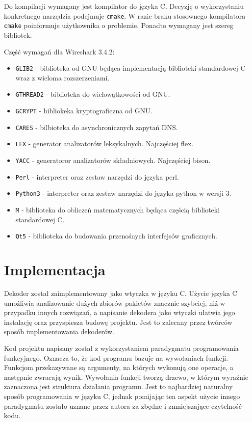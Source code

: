 \documentclass[a4paper, 12pt, twoside, openright]{article}
\begin{document}
	Do kompilacji wymagany jest kompilator do języka C. Decyzję o wykorzystaniu konkretnego narzędzia podejmuje \texttt{cmake}.
	W razie braku stosownego kompilatora \texttt{cmake} poinformuje użytkownika o problemie. Ponadto wymagany jest szereg
	bibliotek.

	Część wymagań dla Wireshark 3.4.2:
	\begin{itemize}
		\item \texttt{GLIB2} - biblioteka od GNU będąca implementacją biblioteki standardowej C wraz z wieloma rozszerzeniami.
		\item \texttt{GTHREAD2} - biblioteka do wielowątkowości od GNU.
		\item \texttt{GCRYPT} - bibliokeka kryptograficzna od GNU.
		\item \texttt{CARES} - bilbioteka do asynchronicznych zapytań DNS.
		\item \texttt{LEX} - generator analizatorów leksykalnych. Najczęściej flex.
		\item \texttt{YACC} - generatoror analizatorów składniowych. Najczęściej bison.
		\item \texttt{Perl} - interpreter oraz zestaw narzędzi do języka perl.
		\item \texttt{Python3} - interpreter oraz zestaw narzędzi do języka python w wersji 3.
		\item \texttt{M} - biblioteka do obliczeń matematycznych będąca częścią biblioteki standardowej C.
		\item \texttt{Qt5} - biblioteka do budowania przenośnych interfejsów graficznych.
	\end{itemize}

	\indent\par




\newpage
\section{Implementacja}

Dekoder został zaimplementowany jako wtyczka w języku C. Użycie języka C umożliwia analizowanie dużych zbiorów pakietów znacznie
szybciej, niż w przypadku innych rozwiązań, a napisanie dekodera jako wtyczki ułatwia jego instalację oraz przyspiesza budowę projektu.
Jest to zalecany przez twórców sposób implementowania dekoderów.

Kod projektu napisany został z wykorzystaniem paradygmatu programowania funkcyjnego. Oznacza to, że kod programu bazuje na wywołaniach
funkcji. Funkcjom przekazywane są argumenty, na których wykonują one operacje, a następnie zwracają wynik. Wywołania funkcji tworzą drzewo,
w którym wyraźnie zaznaczona jest struktura działania programu. Jest to najbardziej naturalny sposób programowania w języku C,
jednak pomijając ten aspekt użycie innego paradygmatu zostało uznane przez autora za zbędne i zmniejszające czytelność kodu.
\end{document}
